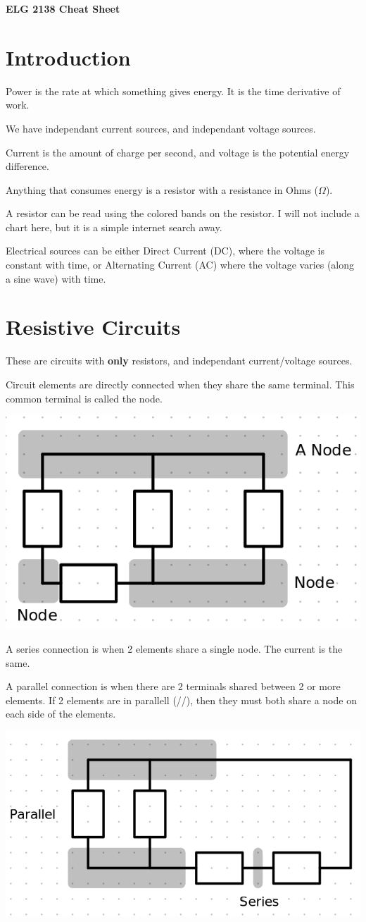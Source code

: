 \documentclass[12pt,letterpaper]{article} \usepackage{amsmath} \usepackage{graphicx} \usepackage[margin=1in]{geometry} \usepackage{longtable}  \usepackage{amssymb}
\begin{document}
	
	\begin{center}
		\Large\textbf{ELG 2138 Cheat Sheet} \\
		\vspace{0.5em}
	\end{center}	

	\section{Introduction}
	Power is the rate at which something gives energy. It is the time derivative of work.
	
	We have independant current sources, and independant voltage sources. 
	
	Current is the amount of charge per second, and voltage is the potential energy difference. 
	
	Anything that consumes energy is a resistor with a resistance in Ohms ($\Omega$).
	
	A resistor can be read using the colored bands on the resistor. I will not include a chart here, but it is a simple internet search away.
	
	Electrical sources can be either Direct Current (DC), where the voltage is constant with time, or Alternating Current (AC) where the voltage varies (along a sine wave) with time. 
	
	\section{Resistive Circuits}
	These are circuits with \textbf{only} resistors, and independant current/voltage sources. 
	
	Circuit elements are directly connected when they share the same terminal. This common terminal is called the node. 
	\begin{center}
		\includegraphics[width=0.5\linewidth]{nodes}
	\end{center}
	
	A series connection is when 2 elements share a single node. The current is the same.
	
	A parallel connection is when there are 2 terminals shared between 2 or more elements. If 2 elements are in parallell (//), then they must both share a node on each side of the elements. 
	\begin{center}
		\includegraphics[width=0.5\linewidth]{parallelseries}
	\end{center}
\end{document}
